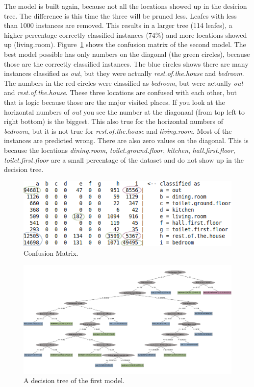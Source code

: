 	The model is built again, because not all the locations showed up in the desicion tree. The difference is this time the three will be pruned less. Leafes with less than 1000 instances are removed. This results in a larger tree (114 leafes), a higher percentage correctly classified instances (74\%) and more locations showed up (living.room). Figure~\ref{fig:confusionmatrix} shows the confusion matrix of the second model. The best model possible has only numbers on the diagonal (the green circles), because those are the correctly classified instances. The blue circles shows there are many instances classified as \emph{out}, but they were actually \emph{rest.of.the.house} and \emph{bedroom}. The numbers in the red circles were classified as \emph{bedroom}, but were actually \emph{out} and \emph{rest.of.the.house}. These three locations are confused with each other, but that is logic because those are the major visited places. If you look at the horizontal numbers of \emph{out} you see the number at the diagonaal (from top left to right bottom) is the biggest. This also true for the horizontal numbers of \emph{bedroom}, but it is not true for \emph{rest.of.the.house} and \emph{living.room}. Most of the instances are predicted wrong. There are also zero values on the diagonal. This is because the locations \emph{dining.room}, \emph{toilet.ground.floor}, \emph{kitchen}, \emph{hall.first.floor}, \emph{toilet.first.floor} are a small percentage of the dataset and do not show up in the decision tree.

			\begin{figure}[h]
				\centering
					\includegraphics[scale=0.7]{confusion.png}
					
				\caption{Confusion Matrix.}
				\label{fig:confusionmatrix}

			\end{figure}


	
	\begin{figure}[h]
		\label{fig:classtree}	
		\centering
		\includegraphics[scale=0.40, angle=90]{tree/edited.png}
		\caption{A decision tree of the first model.}
	\end{figure}


